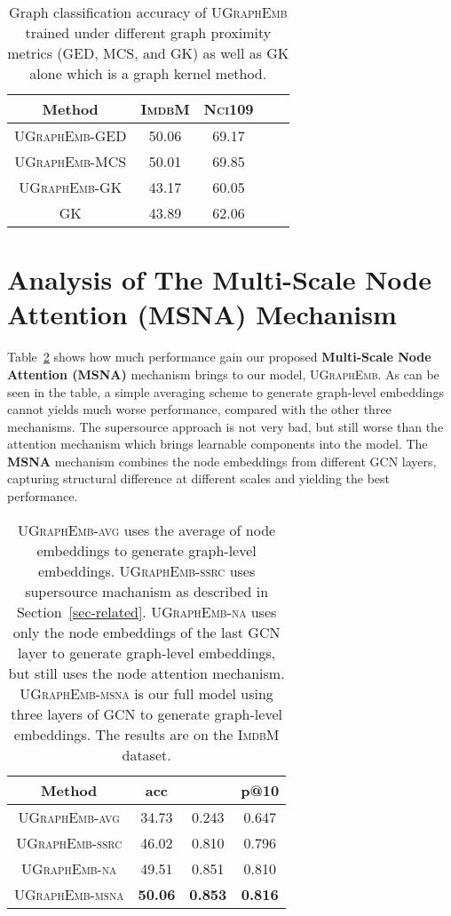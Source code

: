 \documentclass{article}
\newcommand{\model}{\textsc{UGraphEmb}\xspace}
\newcommand{\imdb}{\textsc{ImdbM}\xspace}
\newcommand{\nci}{\textsc{Nci109}\xspace}
\begin{document}
\begin{table}
\begin{tabular}
{ccccc} \hline
\textbf{Method} & \textbf{\imdb} & \textbf{\nci} \\ \hline
\model-GED & 50.06 & 69.17 \\
\model-MCS & 50.01 & 69.85 \\
\model-\textsc{GK} & 43.17 & 60.05 \\
\textsc{GK} & 43.89 & 62.06 \\
\hline
\end{tabular}
\centering
\caption{Graph classification accuracy of \model trained under different graph proximity metrics (GED, MCS, and \textsc{GK}) as well as \textsc{GK} alone which is a graph kernel method.}
\label{table:metric_result}
\end{table}





 \section{Analysis of The \textbf{Multi-Scale Node Attention (MSNA)} Mechanism}
\label{sec-msna}

Table~\ref{table:msna} shows how much performance gain our proposed \textbf{Multi-Scale Node Attention (MSNA)} mechanism brings to our model, \model. As can be seen in the table, a simple averaging scheme to generate graph-level embeddings cannot yields much worse performance, compared with the other three mechanisms. The supersource approach is not very bad, but still worse than the attention mechanism which brings learnable components into the model. The \textbf{MSNA} mechanism combines the node embeddings from different GCN layers, capturing structural difference at different scales and yielding the best performance.

\begin{table}
\begin{tabular}
{cccc} \hline
\textbf{Method} & \textbf{acc} & \textbf{} & \textbf{p@10} \\ \hline
\textsc{\model}-\textsc{avg} & 34.73 & 0.243 & 0.647 \\
\textsc{\model}-\textsc{ssrc} & 46.02 & 0.810 & 0.796 \\
\textsc{\model}-\textsc{na} & 49.51 & 0.851 & 0.810 \\
\textsc{\model}-\textsc{msna} & \textbf{50.06} & \textbf{0.853} & \textbf{0.816} \\
\hline
\end{tabular}
\centering
\caption{\textsc{\model}-\textsc{avg} uses the average of node embeddings to generate graph-level embeddings. \textsc{\model}-\textsc{ssrc} uses supersource machanism as described in Section~\ref{sec-related}. \textsc{\model}-\textsc{na} uses only the node embeddings of the last GCN layer to generate graph-level embeddings, but still uses the node attention mechanism. \textsc{\model}-\textsc{msna} is our full model using three layers of GCN to generate graph-level embeddings. The results are on the \imdb dataset.}
\label{table:msna}
\end{table}
\end{document}
